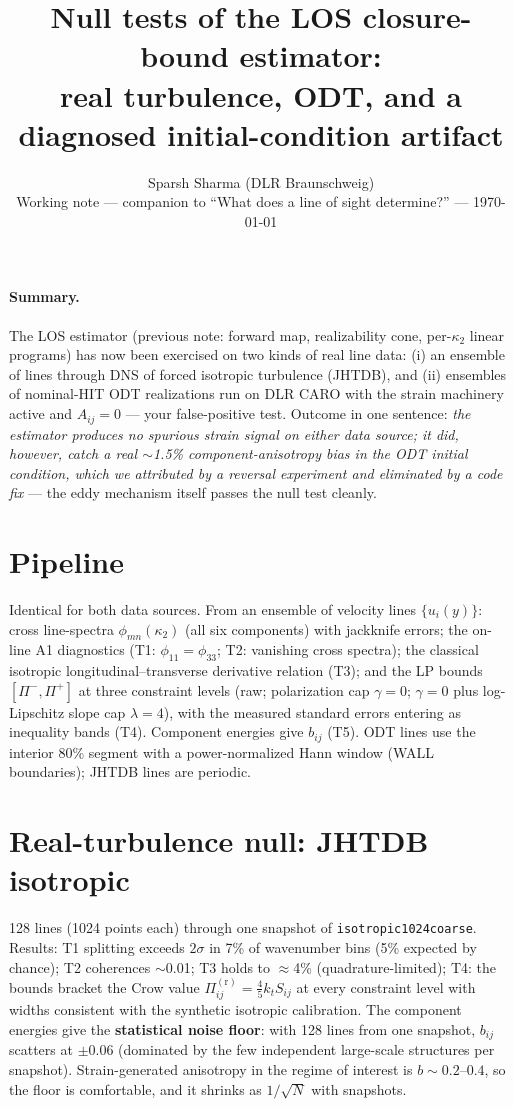 \documentclass[11pt,a4paper]{article}
\title{\vspace{-1.2em}Null tests of the LOS closure-bound estimator:\\
real turbulence, ODT, and a diagnosed initial-condition artifact}
\author{Sparsh Sharma (DLR Braunschweig)\\[0.2em]
\normalsize Working note --- companion to ``What does a line of sight
determine?'' --- \today}
\date{}
\newcommand{\Pir}[1]{\Pi^{(\mathrm r)}_{#1}}
\newcommand{\kt}{k_t}
\begin{document}
\maketitle
\vspace{-2em}

\paragraph{Summary.} The LOS estimator (previous note: forward map,
realizability cone, per-$\kappa_2$ linear programs) has now been exercised on
two kinds of real line data: (i) an ensemble of lines through DNS of forced
isotropic turbulence (JHTDB), and (ii) ensembles of nominal-HIT ODT
realizations run on DLR CARO with the strain machinery active and
$A_{ij}=0$ --- your false-positive test. Outcome in one sentence:
\emph{the estimator produces no spurious strain signal on either data
source; it did, however, catch a real $\sim$1.5\% component-anisotropy bias
in the ODT initial condition, which we attributed by a reversal experiment
and eliminated by a code fix} --- the eddy mechanism itself passes the null
test cleanly.

\section{Pipeline}

Identical for both data sources. From an ensemble of velocity lines
$\{u_i(y)\}$: cross line-spectra $\phi_{mn}(\kappa_2)$ (all six components)
with jackknife errors; the on-line A1 diagnostics
(T1: $\phi_{11}=\phi_{33}$; T2: vanishing cross spectra); the classical
isotropic longitudinal--transverse derivative relation (T3); and the LP
bounds $[\Pi^-,\Pi^+]$ at three constraint levels (raw; polarization cap
$\gamma=0$; $\gamma=0$ plus log-Lipschitz slope cap $\lambda=4$), with the
measured standard errors entering as inequality bands (T4). Component
energies give $b_{ij}$ (T5). ODT lines use the interior 80\% segment with a
power-normalized Hann window (WALL boundaries); JHTDB lines are periodic.

\section{Real-turbulence null: JHTDB isotropic}

128 lines (1024 points each) through one snapshot of
\texttt{isotropic1024coarse}. Results: T1 splitting exceeds $2\sigma$ in
7\% of wavenumber bins (5\% expected by chance); T2 coherences
$\sim$0.01; T3 holds to $\approx$4\% (quadrature-limited); T4: the bounds
bracket the Crow value $\Pir{ij}=\tfrac45 \kt S_{ij}$ at every constraint
level with widths consistent with the synthetic isotropic calibration.
The component energies give the \textbf{statistical noise floor}: with 128
lines from one snapshot, $b_{ij}$ scatters at $\pm 0.06$ (dominated by the
few independent large-scale structures per snapshot). Strain-generated
anisotropy in the regime of interest is $b\sim0.2$--$0.4$, so the floor is
comfortable, and it shrinks as $1/\sqrt{N}$ with snapshots.
\end{document}
